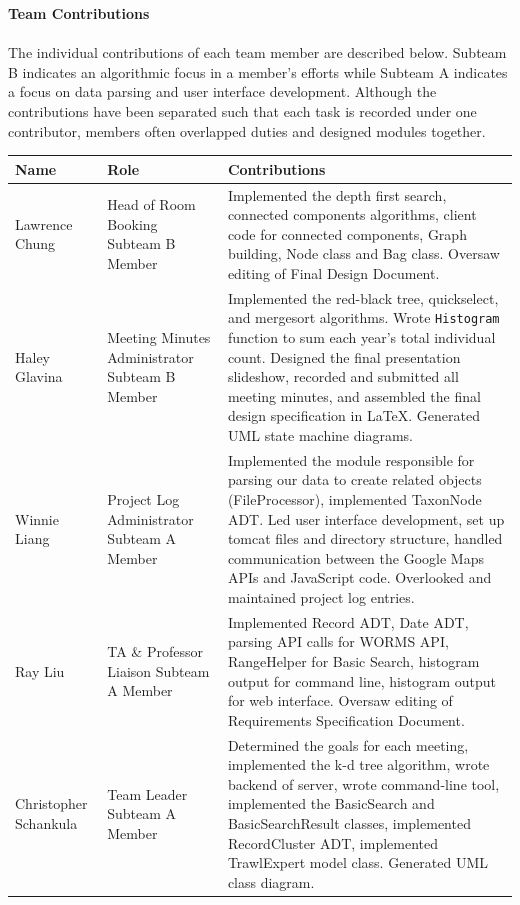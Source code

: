 \documentclass{article}
\begin{document}
\textbf{\Large{Team Contributions}}\\ \\
The individual contributions of each team member are described below. Subteam B indicates an algorithmic focus in a member's efforts while Subteam A indicates a focus on data parsing and user interface development. Although the contributions have been separated such that each task is recorded under one contributor, members often overlapped duties and designed modules together. \\

\begin{table}[h]
	\centering
	\begin{tabular}{p{0.16\hsize}p{0.30\hsize}p{0.46\hsize}}
		\toprule
		\textbf{Name} & \textbf{Role} & \textbf{Contributions}\\
		\midrule
		Lawrence Chung
		& Head of Room Booking \newline Subteam B Member
		& Implemented the depth first search, connected components algorithms, client code for connected components, Graph building, Node class and Bag class. Oversaw editing of Final Design Document.\\
		\midrule
		Haley Glavina
		& Meeting Minutes Administrator \newline Subteam B Member
		& Implemented the red-black tree, quickselect, and mergesort algorithms. Wrote \texttt{Histogram} function to sum each year's total individual count. Designed the final presentation slideshow, recorded and submitted all meeting minutes, and assembled the final design specification in LaTeX. Generated UML state machine diagrams.\\
		\midrule
		Winnie Liang
		& Project Log Administrator \newline Subteam A Member
		& Implemented the module responsible for parsing our data to create related objects (FileProcessor), implemented TaxonNode ADT. Led user interface development, set up tomcat files and directory structure, handled communication between the Google Maps APIs and JavaScript code. Overlooked and maintained project log entries.\\
		\midrule
		Ray Liu
		& TA \& Professor Liaison \newline Subteam A Member
		& Implemented Record ADT, Date ADT, parsing API calls for WORMS API, RangeHelper for Basic Search, histogram output for command line, histogram output for web interface. Oversaw editing of Requirements Specification Document.\\
		\midrule
		Christopher Schankula
		& Team Leader \newline Subteam A Member
		& Determined the goals for each meeting, implemented the k-d tree algorithm, wrote backend of server, wrote command-line tool, implemented the BasicSearch and BasicSearchResult classes, implemented RecordCluster ADT, implemented TrawlExpert model class. Generated UML class diagram.\\		
		\bottomrule
	\end{tabular}
\end{table}
\end{document}
